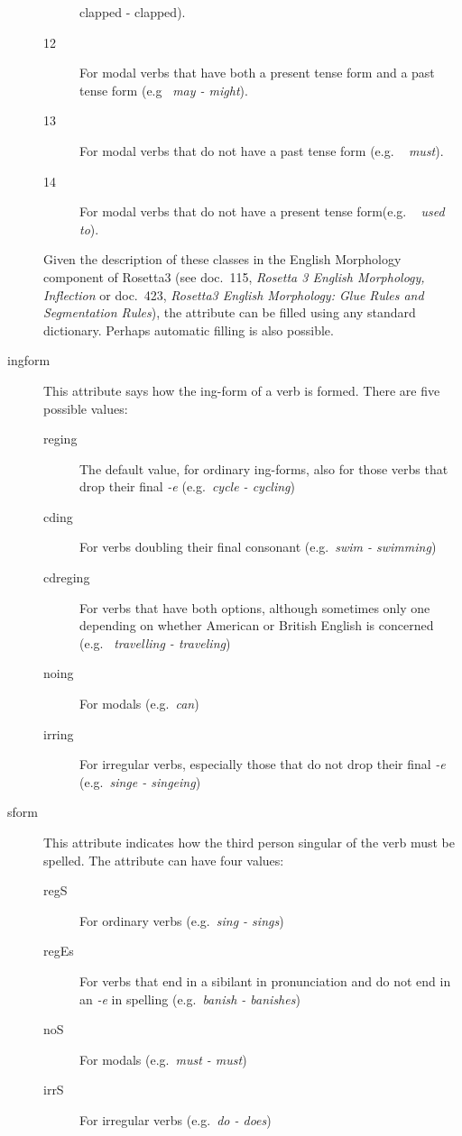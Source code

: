 \begin{description}
\begin{description}
{clapped - clapped\/}).
  \item [12] For modal verbs that have both a present tense form and a past 
tense form (e.g \ {\em may - might\/}).
  \item [13] For modal verbs that do not have a past tense form (e.g. \ {\em 
must\/}).
  \item [14] For modal verbs that do not have a present tense form(e.g. \ {\em 
used to\/}).
\end{description}
 Given the 
description of these classes in the English Morphology component of Rosetta3
(see doc.\ 115, {\em Rosetta 3 English Morphology, Inflection\/} or doc.\ 423, 
{\em Rosetta3 English Morphology: Glue Rules and Segmentation Rules\/}),
the attribute can be filled using any standard dictionary. Perhaps automatic
filling is also possible.

\item[ingform] This attribute says how the ing-form of a verb is formed. There 
are five possible values:
  \begin{description}
  \item[reging] The default value, for ordinary ing-forms, also for those 
verbs that drop their final {\em -e\/} (e.g.\ {\em cycle - cycling\/})
  \item[cding] For verbs doubling their final consonant (e.g.\ {\em swim - 
swimming\/})
  \item[cdreging] For verbs that have both options, although sometimes only one 
depending on whether American or British English is concerned (e.g.\ {\em 
travelling - traveling\/})
  \item[noing] For modals (e.g.\ {\em can\/})
  \item[irring] For irregular verbs, especially those that do not drop their 
final {\em -e\/} (e.g.\ {\em singe - singeing\/})
  \end{description}

\item[sform] This attribute indicates how the third person singular of the verb
must be spelled. The attribute can have four values:
  \begin{description}
  \item[regS] For ordinary verbs (e.g.\ {\em sing - sings\/})
  \item[regEs] For verbs that end in a sibilant in pronunciation and do not end 
in an {\em -e\/} in spelling (e.g.\ {\em banish - banishes\/})
  \item[noS] For modals (e.g.\ {\em must - must\/})
  \item[irrS] For irregular verbs (e.g.\ {\em do - does\/})
  \end{description}


\end{description}
